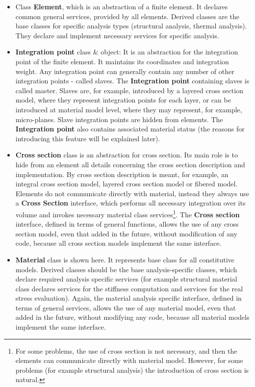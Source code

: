 \documentclass[a4paper]{article}
\newcommand{\class}[1]{{\bf #1}}
\begin{document}
\begin{itemize}
\item
Class \class{Element}, which is an abstraction of a finite element. It declares
common general services, provided by all elements. Derived
classes are the base classes for specific analysis types (structural
analysis, thermal analysis).  They declare and implement necessary services for
specific analysis.

\item
\class{Integration point} class \& object: It is an abstraction for
the integration
point of the finite element. It maintains its coordinates and integration
weight. Any integration point can generally contain any number of
other integration points - called slaves. The \class{Integration
point} containing slaves is called master. Slaves are, for example,
introduced by a layered cross section model, where they represent
integration points for each layer, or can be introduced at material
model level, where they may represent, for example, micro-planes. Slave
integration points are hidden from elements. The \class{Integration point}
also contains associated material status (the reasons for introducing
this feature will be explained later).

\item
\class{Cross section} class is an abstraction for cross section. Its
main role is to hide from an element all details concerning the cross
section description and implementation. By cross section description
is meant, for example, an integral cross section model, layered cross
section model or fibered model. Elements do not communicate directly
with material, instead they always use a \class{Cross Section} interface, which
performs all necessary integration over its volume and invokes
necessary material class services\footnote{For some problems, the use
of cross section is not necessary, and then
the elements can communicate directly with material model. However, for
 some problems (for example structural analysis) the introduction of cross section 
is natural.}. The \class{Cross section} interface, defined in
terms of general functions, allows the use of any cross section
model, even that added in the future, without modification of any code,
because all cross section models implement the same interface.


\item
\class{Material} class is shown here. It represents base class for all
constitutive models. Derived classes should be the base
analysis-specific classes, which declare required analysis
specific services (for example structural material class declares
services for the stiffness computation and services for the real stress
evaluation). Again, the material analysis specific interface, defined
in terms of general services, allows the use of any material model, even
that added in the future, without modifying any code, because all material
models implement the same interface.
\end{itemize}
\end{document}
